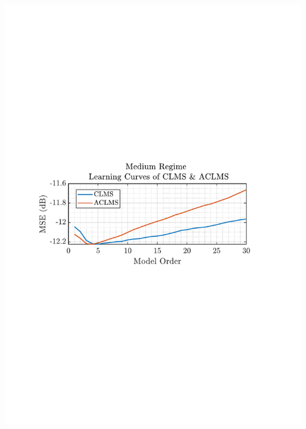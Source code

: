 \documentclass[12pt]{article}
\begin{document}
\begin{minipage}{0.49\textwidth}
				\includegraphics[trim={2.2cm 11.2cm 3.15cm  11.2cm}, clip, width=\textwidth]{../MATLAB/figures/q3_1b_fig06.pdf} 
				

\end{minipage}
\end{document}
